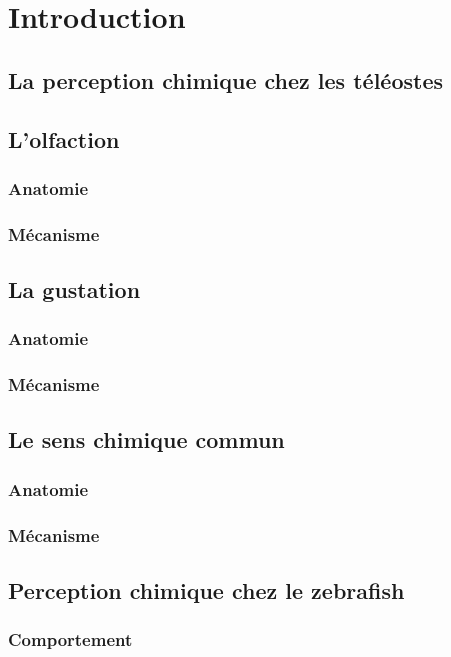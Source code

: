 \chapter{Introduction}

  \section{La perception chimique chez les téléostes}

  \section{L'olfaction}
  \subsection{Anatomie}
  \subsection{Mécanisme}

  \section{La gustation}
  \subsection{Anatomie}
  \subsection{Mécanisme}

  \section{Le sens chimique commun}
  \subsection{Anatomie}
  \subsection{Mécanisme}

  \section{Perception chimique chez le zebrafish}
  \subsection{Comportement}
